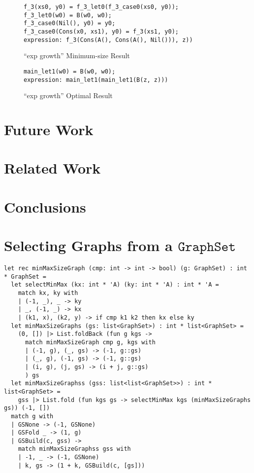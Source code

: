 \documentclass[submission,copyright,creativecommons]{eptcs}
\begin{document}
\begin{figure}
\begin{lstlisting}
f_3(xs0, y0) = f_3_let0(f_3_case0(xs0, y0));
f_3_let0(w0) = B(w0, w0);
f_3_case0(Nil(), y0) = y0;
f_3_case0(Cons(x0, xs1), y0) = f_3(xs1, y0);
expression: f_3(Cons(A(), Cons(A(), Nil())), z))
\end{lstlisting}
\caption{``exp growth'' Minimum-size Result}
\label{fig:ExpGrowthMinResult}
\end{figure}

\begin{figure}
\begin{lstlisting}
main_let1(w0) = B(w0, w0);
expression: main_let1(main_let1(B(z, z)))
\end{lstlisting}
\caption{``exp growth'' Optimal Result}
\label{fig:ExpGrowthOptResult}
\end{figure}

\section{Future Work}

\section{Related Work}

\section{Conclusions}




\appendix

\clearpage
\section{Selecting Graphs from a $\mathtt{GraphSet}$}\label{app:FilterGraphSet}

\begin{lstlisting}[caption={Selecting a Graph of Minimum/Maximum Size from a Graph Set}]
let rec minMaxSizeGraph (cmp: int -> int -> bool) (g: GraphSet) : int * GraphSet =
  let selectMinMax (kx: int * 'A) (ky: int * 'A) : int * 'A =
    match kx, ky with
    | (-1, _), _ -> ky
    | _, (-1, _) -> kx
    | (k1, x), (k2, y) -> if cmp k1 k2 then kx else ky
  let minMaxSizeGraphs (gs: list<GraphSet>) : int * list<GraphSet> =
    (0, []) |> List.foldBack (fun g kgs -> 
      match minMaxSizeGraph cmp g, kgs with
      | (-1, g), (_, gs) -> (-1, g::gs)
      | (_, g), (-1, gs) -> (-1, g::gs)
      | (i, g), (j, gs) -> (i + j, g::gs)
      ) gs
  let minMaxSizeGraphss (gss: list<list<GraphSet>>) : int * list<GraphSet> =
    gss |> List.fold (fun kgs gs -> selectMinMax kgs (minMaxSizeGraphs gs)) (-1, [])
  match g with
  | GSNone -> (-1, GSNone)
  | GSFold _ -> (1, g)
  | GSBuild(c, gss) -> 
    match minMaxSizeGraphss gss with
    | -1, _ -> (-1, GSNone)
    | k, gs -> (1 + k, GSBuild(c, [gs]))
\end{lstlisting}
\end{document}
